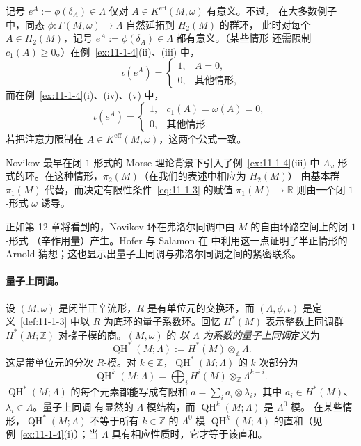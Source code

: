 \begin{remark}\label{rem:11-1-5}
记号 $e^A:=\phi(\delta_A)\in\Lambda$ 仅对 $A\in K^{\mathrm{eff}}(M,\omega)$ 有意义。不过，
在大多数例子中，同态 $\phi:\Gamma(M,\omega)\to\Lambda$ 自然延拓到 $H_2(M)$ 的群环，
此时对每个 $A\in H_2(M)$，记号 $e^A:=\phi(\delta_A)\in\Lambda$ 都有意义。（某些情形
还需限制 $c_1(A)\ge0$。）在例~\ref{ex:11-1-4}(ii)、(iii) 中，
\[
  \iota(e^A)=
  \begin{cases}1,&A=0,\\0,&\text{其他情形},\end{cases}
\]
而在例~\ref{ex:11-1-4}(i)、(iv)、(v) 中，
\[
  \iota(e^A)=
  \begin{cases}1,&c_1(A)=\omega(A)=0,\\0,&\text{其他情形}.
  \end{cases}
\]
若把注意力限制在 $A\in K^{\mathrm{eff}}(M,\omega)$，这两个公式一致。
\end{remark}

\begin{remark}\label{rem:11-1-6}
Novikov  最早在闭 $1$-形式的 Morse 理论背景下引入了例~\ref{ex:11-1-4}(iii)
中 $\Lambda_\omega$ 形式的环。在这种情形，$\pi_2(M)$（在我们的表述中相应为 $H_2(M)$）
由基本群 $\pi_1(M)$ 代替，而决定有限性条件~\eqref{eq:11-1-3} 的赋值
$\pi_1(M)\to\mathbb R$ 则由一个闭 $1$-形式 $\omega$ 诱导。

正如第 12 章将看到的，Novikov 环在弗洛尔同调中由 $M$ 的自由环路空间上的闭 $1$-形式
（辛作用量）产生。Hofer 与 Salamon 在  中利用这一点证明了半正情形的
Arnold 猜想；这也显示出量子上同调与弗洛尔同调之间的紧密联系。
\end{remark}
\paragraph{量子上同调。}
设 $(M,\omega)$ 是闭半正辛流形，$R$ 是有单位元的交换环，而
$(\Lambda,\phi,\iota)$ 是定义~\ref{def:11-1-3} 中以 $R$ 为底环的量子系数环。回忆
$H^*(M)$ 表示整数上同调群 $H^*(M;\mathbb Z)$ 对挠子模的商。$(M,\omega)$ 的
\emph{以 $\Lambda$ 为系数的量子上同调}定义为
\[
  \operatorname{QH}^*(M;\Lambda):=H^*(M)\otimes_{\mathbb Z}\Lambda.
\]
这是带单位元的分次 $R$-模。对 $k\in\mathbb Z$，$\operatorname{QH}^*(M;\Lambda)$ 的
$k$ 次部分为
\[
  \operatorname{QH}^k(M;\Lambda)
  =\bigoplus_iH^i(M)\otimes_{\mathbb Z}\Lambda^{k-i}.
\]
$\operatorname{QH}^*(M;\Lambda)$ 的每个元素都能写成有限和
$a=\sum_i a_i\otimes\lambda_i$，其中 $a_i\in H^*(M)$、$\lambda_i\in\Lambda$。量子上同调
有显然的 $\Lambda$-模结构，而 $\operatorname{QH}^k(M;\Lambda)$ 是 $\Lambda^0$-模。
在某些情形，$\operatorname{QH}^*(M;\Lambda)$ 不等于所有
$k\in\mathbb Z$ 的 $\Lambda^0$-模 $\operatorname{QH}^k(M;\Lambda)$ 的直和（见
例~\ref{ex:11-1-4}(i)）；当 $\Lambda$ 具有相应性质时，它才等于该直和。


